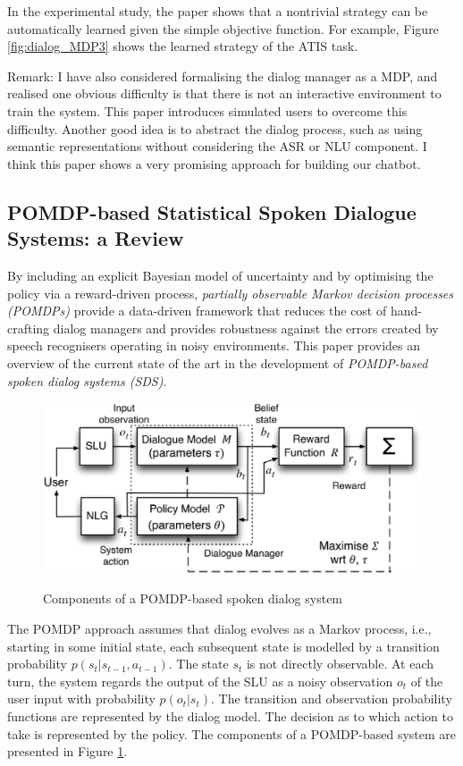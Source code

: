 \documentclass[paper=a4, fontsize=18pt]{article} %
\numberwithin{equation}{section} %
\numberwithin{figure}{section} %
\numberwithin{table}{section} %
\begin{document}
In the experimental study, the paper shows that a nontrivial strategy can be automatically learned given the simple objective function. For example, Figure \ref{fig:dialog_MDP3} shows the learned strategy of the ATIS task.

Remark: I have also considered formalising the dialog manager as a MDP, and realised one obvious difficulty is that there is not an interactive environment to train the system. This paper introduces simulated users to overcome this difficulty. Another good idea is to abstract the dialog process, such as using semantic representations without considering the ASR or NLU component. I think this paper shows a very promising approach for building our chatbot.

\subsection{POMDP-based Statistical Spoken Dialogue Systems: a Review \cite{Young2013Pomdp}}

By including an explicit Bayesian model of uncertainty and by optimising the policy via a reward-driven process, \emph{partially observable Markov decision processes (POMDPs)} provide a data-driven framework that reduces the cost of hand-crafting dialog managers and provides robustness against the errors created by speech recognisers operating in noisy environments. This paper provides an overview of the current state of the art in the development of \emph{POMDP-based spoken dialog systems (SDS)}.

\begin{figure}[htbp]
  \centering
  \includegraphics[width=.7\linewidth]{10_17_POMDP1}\\
  \caption{Components of a POMDP-based spoken dialog system}\label{fig:POMDP1}
\end{figure}

The POMDP approach assumes that dialog evolves as a Markov process, i.e., starting in some initial state, each subsequent state is modelled by a transition probability $p(s_t | s_{t-1}, a_{t-1})$. The state $s_t$ is not directly observable. At each turn, the system regards the output of the SLU as a noisy observation $o_t$ of the user input with probability $p(o_t | s_t)$. The transition and observation probability functions are represented by the dialog model. The decision as to which action to take is represented by the policy. The components of a POMDP-based system are presented in Figure \ref{fig:POMDP1}.
\end{document}
